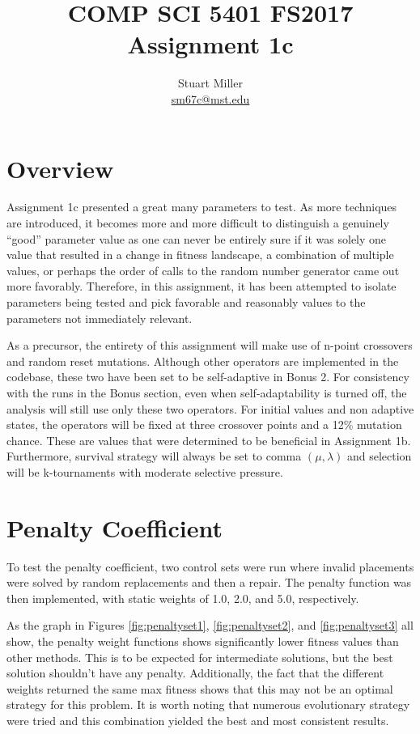 \documentclass[11pt]{article}
\begin{document}
\title{COMP SCI 5401 FS2017 Assignment 1c}
\author{Stuart Miller\\\href{mailto:sm67c@mst.edu}{sm67c@mst.edu}}
\maketitle


\section{Overview}\label{sect:overview}

Assignment 1c presented a great many parameters to test. As more techniques are introduced, it becomes more and more difficult to distinguish a genuinely "`good"' parameter value as one can never be entirely sure if it was solely one value that resulted in a change in fitness landscape, a combination of multiple values, or perhaps the order of calls to the random number generator came out more favorably. Therefore, in this assignment, it has been attempted to isolate parameters being tested and pick favorable and reasonably values to the parameters not immediately relevant.

As a precursor, the entirety of this assignment will make use of n-point crossovers and random reset mutations. Although other operators are implemented in the codebase, these two have been set to be self-adaptive in Bonus 2. For consistency with the runs in the Bonus section, even when self-adaptability is turned off, the analysis will still use only these two operators. For initial values and non adaptive states, the operators will be fixed at three crossover points and a 12\% mutation chance. These are values that were determined to be beneficial in Assignment 1b. Furthermore, survival strategy will always be set to comma \((\mu,\lambda)\) and selection will be k-tournaments with moderate selective pressure.


\section{Penalty Coefficient}\label{sect:penalty}

To test the penalty coefficient, two control sets were run where invalid placements were solved by random replacements and then a repair. The penalty function was then implemented, with static weights of 1.0, 2.0, and 5.0, respectively.

As the graph in Figures \ref{fig:penaltyset1}, \ref{fig:penaltyset2}, and \ref{fig:penaltyset3} all show, the penalty weight functions shows significantly lower fitness values than other methods. This is to be expected for intermediate solutions, but the best solution shouldn't have any penalty. Additionally, the fact that the different weights returned the same max fitness shows that this may not be an optimal strategy for this problem. It is worth noting that numerous evolutionary strategy were tried and this combination yielded the best and most consistent results.
\end{document}
